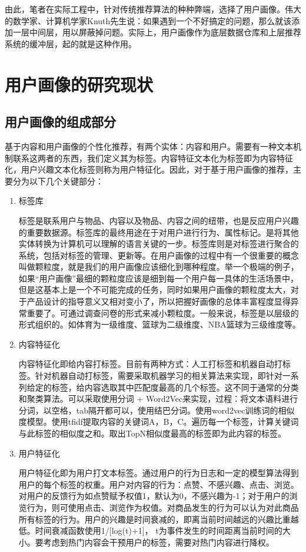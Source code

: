 	由此，笔者在实际工程中，针对传统推荐算法的种种弊端，选择了用户画像。伟大的数学家、计算机学家Knuth先生说：如果遇到一个不好搞定的问题，那么就该添加一层中间层，用以屏蔽掉问题。实际上，用户画像作为底层数据仓库和上层推荐系统的缓冲层，起的就是这种作用。

	\section{用户画像的研究现状}
		\subsection{用户画像的组成部分}
		基于内容和用户画像的个性化推荐，有两个实体：内容和用户。需要有一种文本机制联系这两者的东西，我们定义其为标签。内容特征文本化为标签即为内容特征化，用户兴趣文本化标签则称为用户特征化\citep{user-profile,user-profile1,user-profile2,user-profile3,user-profile4}。因此，对于基于用户画像的推荐，主要分为以下几个关键部分：
		\begin{enumerate}[(1)]
		\item 标签库

		标签是联系用户与物品、内容以及物品、内容之间的纽带，也是反应用户兴趣的重要数据源。标签库的最终用途在于对用户进行行为、属性标记。是将其他实体转换为计算机可以理解的语言关键的一步。标签库则是对标签进行聚合的系统，包括对标签的管理、更新等。在用户画像的过程中有一个很重要的概念叫做颗粒度，就是我们的用户画像应该细化到哪种程度。举一个极端的例子，如果“用户画像”最细的颗粒度应该是细到每一个用户每一具体的生活场景中，但是这基本上是一个不可能完成的任务，同时如果用户画像的颗粒度太大，对于产品设计的指导意义又相对变小了，所以把握好画像的总体丰富程度显得异常重要了。可通过调查问卷的形式来减小颗粒度。一般来说，标签是以层级的形式组织的。如体育为一级维度、篮球为二级维度、NBA篮球为三级维度等。

		\item 内容特征化

		内容特征化即给内容打标签。目前有两种方式：人工打标签和机器自动打标签。针对机器自动打标签，需要采取机器学习的相关算法来实现，即针对一系列给定的标签，给内容选取其中匹配度最高的几个标签。这不同于通常的分类和聚类算法\citep{recmd-kmeans}。可以采取使用分词 + Word2Vec来实现，过程：将文本语料进行分词，以空格，tab隔开都可以，使用结巴分词。使用word2vec训练词的相似度模型。使用tfidf提取内容的关键词A，B，C。遍历每一个标签，计算关键词与此标签的相似度之和。取出TopN相似度最高的标签即为此内容的标签。

		\item 用户特征化

		用户特征化即为用户打文本标签。通过用户的行为日志和一定的模型算法得到用户的每个标签的权重。用户对内容的行为：点赞、不感兴趣、点击、浏览。对用户的反馈行为如点赞赋予权值1，默认为0，不感兴趣为-1；对于用户的浏览行为，则可使用点击、浏览作为权值。对商品发生的行为可以认为对此商品所有标签的行为。用户的兴趣是时间衰减的，即离当前时间越远的兴趣比重越低。时间衰减函数使用1/[log(t)+1]， t为事件发生的时间距离当前时间的大小。要考虑到热门内容会干预用户的标签，需要对热门内容进行降权。
		\end{enumerate}

